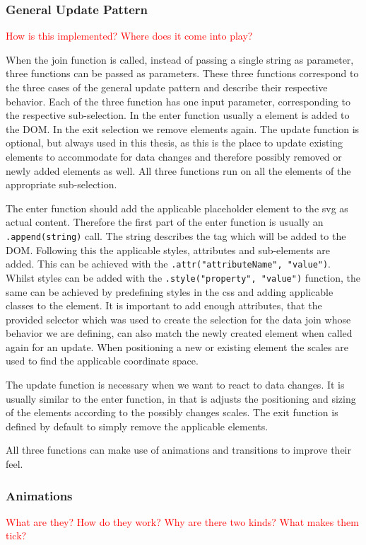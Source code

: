 \subsubsection{General Update Pattern}
\textcolor{red}{
How is this implemented? Where does it come into play?}

When the join function is called, instead of passing a single string as parameter, three functions can be passed as parameters. These three functions correspond to the three cases of the general update pattern and describe their respective behavior. Each of the three function has one input parameter, corresponding to the respective sub-selection. In the enter function usually a element is added to the DOM. In the exit selection we remove elements again. The update function is optional, but always used in this thesis, as this is the place to update existing elements to accommodate for data changes and therefore possibly removed or newly added elements as well. All three functions run on all the elements of the appropriate sub-selection.

The enter function should add the applicable placeholder element to the svg as actual content. Therefore the first part of the enter function is usually an \verb|.append(string)| call. The string describes the tag which will be added to the DOM. Following this the applicable styles, attributes and sub-elements are added. This can be achieved with the \verb|.attr("attributeName", "value")|. Whilst styles can be added with the \verb|.style("property", "value")| function, the same can be achieved by predefining styles in the css and adding applicable classes to the element. It is important to add enough attributes, that the provided selector which was used to create the selection for the data join whose behavior we are defining, can also match the newly created element when called again for an update. When positioning a new or existing element the  scales are used to find the applicable coordinate space.

The update function is necessary when we want to react to data changes. It is usually similar to the enter function, in that is adjusts the positioning and sizing of the elements according to the possibly changes scales. The exit function is defined by default to simply remove the applicable elements.

All three functions can make use of animations and transitions to improve their feel.

\subsubsection{Animations}
\textcolor{red}{
What are they? How do they work? Why are there two kinds? What makes them tick?}


